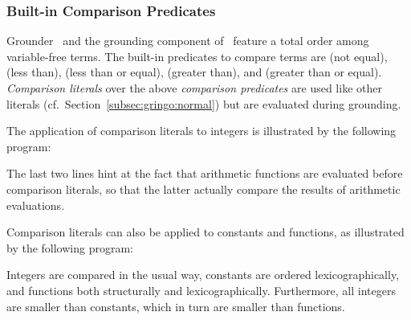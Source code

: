 \subsubsection{Built-in Comparison Predicates}\label{subsec:gringo:comp}

Grounder \gringo\ and the grounding component of \clingo\
feature a total order among variable-free terms.
The built-in predicates to compare terms are
\code{!=} (not equal),
\code{<} (less than),
\code{<=} (less than or equal),
\code{>} (greater than), and
\code{>=} (greater than or equal).
\emph{Comparison literals} over the above \emph{comparison predicates} are used like
other literals (cf.\ Section~\ref{subsec:gringo:normal})
but are evaluated during grounding.

\begin{example}\label{ex:arith:pred}
The application of comparison literals to integers
is illustrated by the following program:%
%

%
The last two lines hint at the fact that arithmetic functions are evaluated
before comparison literals, so that the latter actually compare the
results of arithmetic evaluations.
\end{example}

\begin{example}\label{ex:symb:pred}
Comparison literals can also be applied to constants and functions,
as illustrated by the following program:%
%

%
Integers are compared in the usual way, constants are ordered lexicographically,
and functions both structurally and lexicographically.
Furthermore, all integers are smaller than constants,
which in turn are smaller than functions.
\end{example}

